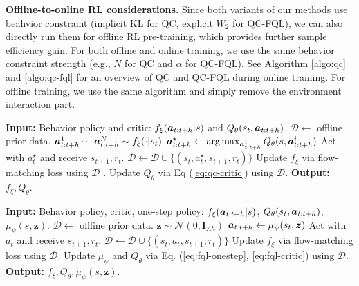 \textbf{Offline-to-online RL considerations.} Since both variants of our methods use beahvior constraint (implicit KL for QC, explicit $W_2$ for QC-FQL), we can also directly run them for offline RL pre-training, which provides further sample efficiency gain. For both offline and online training, we use the same behavior constraint strength (e.g., $N$ for QC and $\alpha$ for QC-FQL). See Algorithm \ref{algo:qc} and \ref{algo:qc-fql} for an overview of QC and QC-FQL during online training. For offline training, we use the same algorithm and simply remove the environment interaction part. 





\begin{minipage}{0.48\textwidth}
\begin{algorithm}[H]
\caption{{\color{ourpurple}$\mathtt{QC}$}}
\label{algo:qc}
\begin{algorithmic}

\small
\State \textbf{Input:} Behavior policy and critic: $f_\xi(\boldsymbol{a}_{t:t+h} | s)$ and $Q_\theta(s_t, \boldsymbol{a}_{t:t+h})$.
\State $\mathcal{D} \leftarrow$ offline prior data.
        \State $\boldsymbol{a}_{t:t+h}^1 \cdots \boldsymbol{a}_{t:t+h}^N \sim f_\xi(\cdot | s_t)$
        \State $\boldsymbol{a}_{t:t+h}^\star \leftarrow \arg\max_{\boldsymbol{a}_{t:t+h}^i} Q_\theta(s, \boldsymbol{a}_{t:t+h}^i)$
    \EndIf
    \State Act with $a^\star_t$ and receive $s_{t+1}, r_t$.
    \State $\mathcal{D} \leftarrow \mathcal{D} \cup \{(s_t, a^\star_t, s_{t+1}, r_t)\}$
    \State Update $f_\xi$ via flow-matching loss using $\mathcal{D}$ .
    \State Update $Q_\theta$ via Eq (\ref{eq:qc-critic}) using $\mathcal{D}$.
\EndFor
\State \textbf{Output:} $f_\xi, Q_\theta$.
\end{algorithmic}
\end{algorithm}
\end{minipage}
\hfill
\begin{minipage}{0.48\textwidth}
\begin{algorithm}[H]
\caption{{\color{ourpurple}$\mathtt{QC}$-$\mathtt{FQL}$}}
\label{algo:qc-fql}
\begin{algorithmic}
\small
\State \textbf{Input:} Behavior policy, critic, one-step policy: $f_\xi(\boldsymbol{a}_{t:t+h} | s)$, $Q_\theta(s_t, \boldsymbol{a}_{t:t+h})$, $\mu_\psi(s, \mathbf z)$.
\State $\mathcal{D} \leftarrow$ offline prior data.
        \State $\mathbf z \sim \mathcal{N}(0, \mathbf I_{Ah})$
        \State $\boldsymbol{a}_{t:t+h} \leftarrow \mu_\psi(s_t, \boldsymbol z)$
    \EndIf
    \State Act with $a_t$ and receive $s_{t+1}, r_t$.
    \State $\mathcal{D} \leftarrow \mathcal{D} \cup \{(s_t, a_t, s_{t+1}, r_t)\}$
    \State Update $f_\xi$ via flow-matching loss using $\mathcal{D}$.
    \State Update $\mu_{\psi}$ and $Q_\theta$ via Eq. (\ref{eq:fql-onestep}, \ref{eq:fql-critic}) using $\mathcal{D}$.
\EndFor
\State \textbf{Output:} $f_\xi, Q_\theta, \mu_\psi(s, \mathbf z)$.
\end{algorithmic}
\end{algorithm}
\end{minipage}

